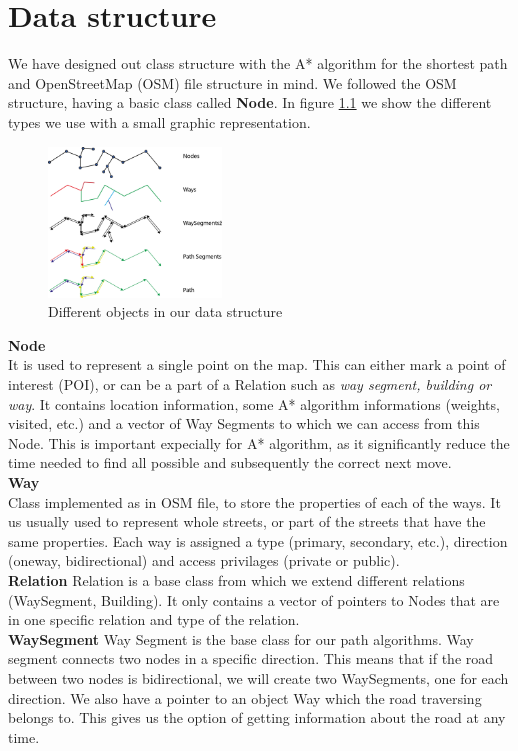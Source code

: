 \documentclass[reqno,openany,12pt]{amsbook}
\theoremstyle{definition}
\theoremstyle{remark}
\begin{document}
 \chapter{Data structure}
 We have designed out class structure with the A* algorithm for the shortest path and OpenStreetMap (OSM) file structure in mind. We followed the OSM structure, having a basic class called \textbf{Node}. In figure \ref{fig:types_db} we show the different types we use with a small graphic representation.
 \begin{figure}[h]
 \centering
 \includegraphics[height=4cm]{../photos/ways.png}
 \caption{Different objects in our data structure}
 \label{fig:types_db}
 \end{figure}
  \textbf{Node}
\\It is used to represent a single point on the map. This can either mark a point of interest (POI), or can be a part of a Relation such as \textit{way segment, building or way}. It contains location information, some A* algorithm informations (weights, visited, etc.) and a vector of Way Segments to which we can access from this Node. This is important expecially for A* algorithm, as it significantly reduce the time needed to find all possible and subsequently the correct next move.
\\
\textbf{Way}\\
Class implemented as in OSM file, to store the properties of each of the ways. It us usually used to represent whole streets, or part of the streets that have the same properties. Each way is assigned a type (primary, secondary, etc.), direction (oneway, bidirectional) and access privilages (private or public).\\
\textbf{Relation}
Relation is a base class from which we extend different relations (WaySegment, Building). It only contains a vector of pointers to Nodes that are in one specific relation and type of the relation.\\
\textbf{WaySegment}
Way Segment is the base class for our path algorithms. Way segment connects two nodes in a specific direction. This means that if the road between two nodes is bidirectional, we will create two WaySegments, one for each direction. We also have a pointer to an object Way which the road traversing belongs to. This gives us the option of getting information about the road at any time.
\end{document}
